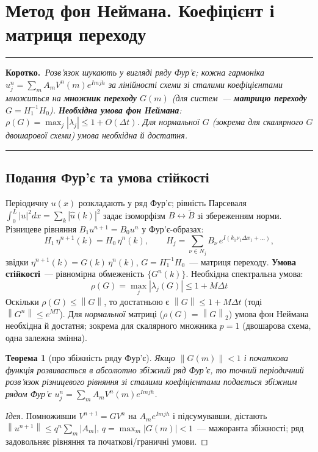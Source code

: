 \documentclass[12pt,a4paper]{article}
\theoremstyle{definition}
\theoremstyle{plain}
\newtheorem*{teorema*}{Теорема}
\newenvironment{korotko}
  {\par\medskip\noindent\begingroup\color{accent!75!black}\rule{\linewidth}{0.4pt}\par
   \noindent\textbf{Коротко.}\itshape\,}
  {\par\noindent\rule{\linewidth}{0.4pt}\endgroup\medskip}
\newcommand{\norm}[1]{\left\lVert #1 \right\rVert}
\newcommand{\abs}[1]{\left\lvert #1 \right\rvert}
\begin{document}
\newpage
\section{Метод фон Неймана. Коефіцієнт і матриця переходу}

\begin{korotko}
Розв'язок шукають у вигляді ряду Фур'є; кожна гармоніка
$u^n_j=\sum_m A_m V^n(m)e^{Imjh}$ за лінійності схеми зі сталими
коефіцієнтами множиться на \textbf{множник переходу} $G(m)$ (для систем~---
\textbf{матрицю переходу} $G=H_1^{-1}H_0$). \textbf{Необхідна умова фон
Неймана}: $\rho(G)=\max_j\abs{\lambda_j}\le1+O(\Delta t)$. Для нормальної
$G$ (зокрема для скалярного $G$ двошарової схеми) умова \emph{необхідна й
достатня}.
\end{korotko}

\subsection{Подання Фур'є та умова стійкості}
Періодичну $u(x)$ розкладають у ряд Фур'є; рівність Парсеваля
$\int_0^L\abs{u}^2dx=\sum_{k}\abs{\hat u(k)}^2$ задає ізоморфізм
$B\leftrightarrow\tilde B$ зі збереженням норми. Різницеве рівняння
$B_1u^{n+1}=B_0u^n$ у Фур'є-образах:
\begin{equation}
  H_1\,\eta^{n+1}(k)=H_0\,\eta^{n}(k),\qquad
  H_j=\sum_{\nu\in N_j} B_\nu\,e^{I(k_1\nu_1\Delta x_1+\dots)},
\end{equation}
звідки $\eta^{n+1}(k)=G(k)\,\eta^n(k)$, $G=H_1^{-1}H_0$~--- матриця
переходу. \textbf{Умова стійкості}~--- рівномірна обмеженість
$\{G^n(k)\}$. Необхідна спектральна умова:
\begin{equation}
  \boxed{\;\rho(G)=\max_j\abs{\lambda_j(G)}\le1+M\Delta t\;}
\end{equation}
Оскільки $\rho(G)\le\norm{G}$, то достатньою є $\norm{G}\le1+M\Delta t$
(тоді $\norm{G^n}\le e^{MT}$). Для \emph{нормальної} матриці
($\rho(G)=\norm{G}_2$) умова фон Неймана необхідна й достатня; зокрема для
скалярного множника $p=1$ (двошарова схема, одна залежна змінна).

\begin{teorema*}[про збіжність ряду Фур'є]
Якщо $\norm{G(m)}<1$ і початкова функція розвивається в абсолютно збіжний
ряд Фур'є, то точний періодичний розв'язок різницевого рівняння зі
сталими коефіцієнтами подається збіжним рядом Фур'є
$u^n_j=\sum_m A_m V^n(m)e^{Imjh}$.
\end{teorema*}
\begin{proof}[Ідея]
Помноживши $V^{n+1}=GV^n$ на $A_m e^{Imjh}$ і підсумувавши, дістають
$\norm{u^{n+1}}\le q^n\sum_m\abs{A_m}$, $q=\max_m\abs{G(m)}<1$~---
мажоранта збіжності; ряд задовольняє рівняння та початкові/граничні
умови.
\end{proof}
\end{document}
